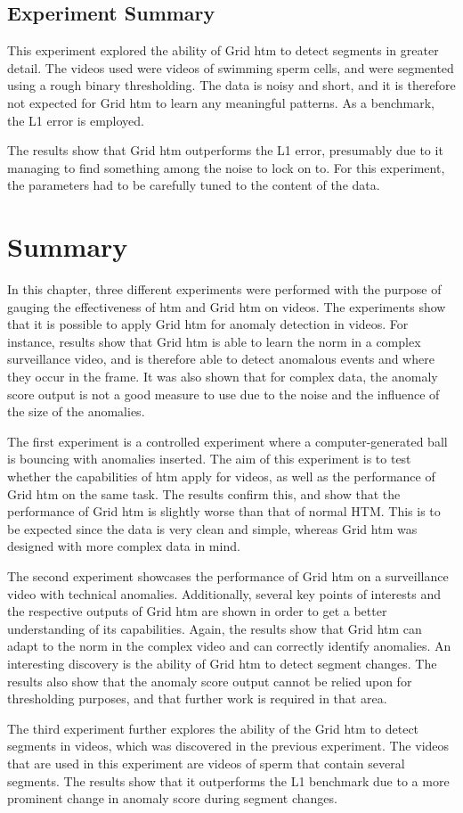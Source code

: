 \subsection{Experiment Summary}
This experiment explored the ability of Grid \gls*{htm} to detect segments in greater detail. The videos used were videos of swimming sperm cells, and were segmented using a rough binary thresholding. The data is noisy and short, and it is therefore not expected for Grid \gls*{htm} to learn any meaningful patterns. As a benchmark, the L1 error is employed.
\par
The results show that Grid \gls*{htm} outperforms the L1 error, presumably due to it managing to find something among the noise to lock on to. For this experiment, the parameters had to be carefully tuned to the content of the data.
\clearpage
\section{Summary}
In this chapter, three different experiments were performed with the purpose of gauging the effectiveness of \gls*{htm} and Grid \gls*{htm} on videos. The experiments show that it is possible to apply Grid \gls*{htm} for anomaly detection in videos. For instance, results show that Grid \gls*{htm} is able to learn the norm in a complex surveillance video, and is therefore able to detect anomalous events and where they occur in the frame. It was also shown that for complex data, the anomaly score output is not a good measure to use due to the noise and the influence of the size of the anomalies.
\par
The first experiment is a controlled experiment where a computer-generated ball is bouncing with anomalies inserted. The aim of this experiment is to test whether the capabilities of \gls*{htm} apply for videos, as well as the performance of Grid \gls*{htm} on the same task. The results confirm this, and show that the performance of Grid \gls*{htm} is slightly worse than that of normal HTM. This is to be expected since the data is very clean and simple, whereas Grid \gls*{htm} was designed with more complex data in mind.
\par
The second experiment showcases the performance of Grid \gls*{htm} on a surveillance video with technical anomalies. Additionally, several key points of interests and the respective outputs of Grid \gls*{htm} are shown in order to get a better understanding of its capabilities. Again, the results show that Grid \gls*{htm} can adapt to the norm in the complex video and can correctly identify anomalies. An interesting discovery is the ability of Grid \gls*{htm} to detect segment changes. The results also show that the anomaly score output cannot be relied upon for thresholding purposes, and that further work is required in that area.
\par
The third experiment further explores the ability of the Grid \gls*{htm} to detect segments in videos, which was discovered in the previous experiment. The videos that are used in this experiment are videos of sperm that contain several segments. The results show that it outperforms the L1 benchmark due to a more prominent change in anomaly score during segment changes.

